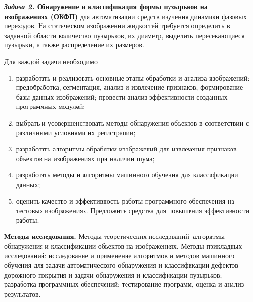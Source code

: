 \textbf{\textit{Задача 2.} Обнаружение и классификация формы пузырьков на изображениях (ОКФП)} для автоматизации средств изучения динамики фазовых переходов.  На статическом изображении жидкостей требуется определить в заданной области количество пузырьков, их диаметр, выделить пересекающиеся пузырьки, а также распределение их размеров.

Для каждой задачи необходимо
\begin{enumerate}
\item разработать и реализовать основные этапы обработки и анализа изображений: предобработка, сегментация, анализ и извлечение признаков, формирование базы данных изображений; провести анализ эффективности созданных программных модулей;
\item выбрать и усовершенствовать методы обнаружения объектов в соответствии с различными условиями их регистрации;
\item разработать алгоритмы обработки изображений для извлечения признаков объектов на изображениях при наличии шума;
\item разработать методы и алгоритмы машинного обучения для классификации данных;
\item оценить качество и эффективность работы программного обеспечения на тестовых изображениях. Предложить средства для повышения эффективности работы.
\end{enumerate}

\textbf{Методы исследования.} Методы теоретических исследований: алгоритмы обнаружения и классификации объектов на изображениях. Методы прикладных исследований: исследование и применение алгоритмов и методов машинного обучения для задачи автоматического обнаружения и классификации дефектов дорожного покрытия и задачи обнаружения и классификации пузырьков; разработка программных обеспечений; тестирование программ, оценка и анализ результатов.

